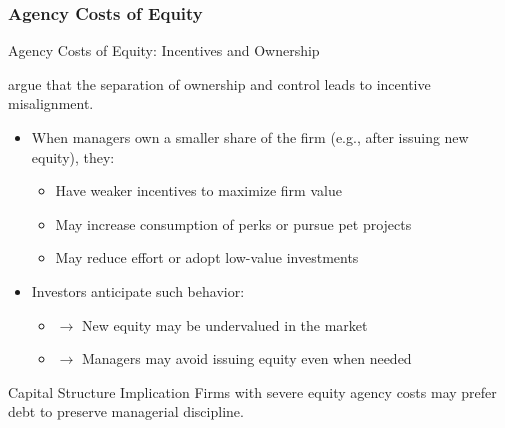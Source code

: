 \subsubsection{Agency Costs of Equity}
\begin{frame}{Agency Costs of Equity: Incentives and Ownership}
	
	\textbf{\textcite{jensen1976theory}} argue that the separation of ownership and control leads to incentive misalignment.
	
	\vspace{0.3cm}
	\begin{itemize}
		\item When managers own a smaller share of the firm (e.g., after issuing new equity), they:
		\begin{itemize}
			\item Have weaker incentives to maximize firm value
			\item May increase consumption of perks or pursue pet projects
			\item May reduce effort or adopt low-value investments
		\end{itemize}
		
		\item Investors anticipate such behavior:
		\begin{itemize}
			\item $\rightarrow$ New equity may be undervalued in the market
			\item $\rightarrow$ Managers may avoid issuing equity even when needed
		\end{itemize}
	\end{itemize}
	
	\vspace{0.2cm}
	\begin{alertblock}{Capital Structure Implication}
		Firms with severe equity agency costs may prefer debt to preserve managerial discipline.
	\end{alertblock}
	
\end{frame}


